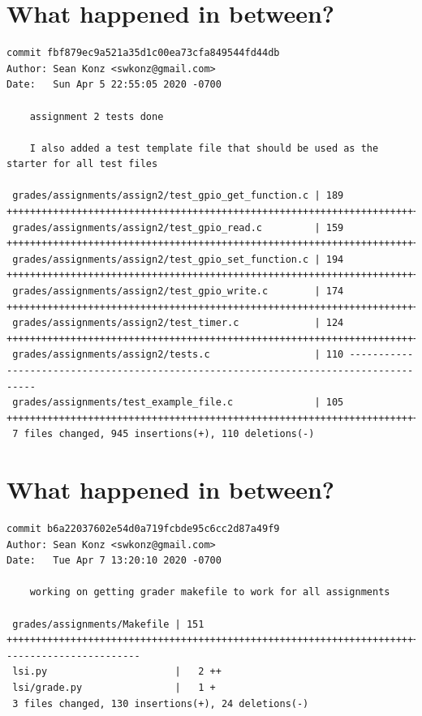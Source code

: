 \documentclass{article}
\begin{document}
\section*{What happened in between?}
\vspace{2ex}
\begin{verbatim}
commit fbf879ec9a521a35d1c00ea73cfa849544fd44db
Author: Sean Konz <swkonz@gmail.com>
Date:   Sun Apr 5 22:55:05 2020 -0700

    assignment 2 tests done

    I also added a test template file that should be used as the starter for all test files

 grades/assignments/assign2/test_gpio_get_function.c | 189 ++++++++++++++++++++++++++++++++++++++++++++++++++++++++++++++++++++++++++++++++++++++++++++++++++++++++++++++++++++++++++++++++++++++++++++++++++++
 grades/assignments/assign2/test_gpio_read.c         | 159 ++++++++++++++++++++++++++++++++++++++++++++++++++++++++++++++++++++++++++++++++++++++++++++++++++++++++++++++++++++++++++++
 grades/assignments/assign2/test_gpio_set_function.c | 194 ++++++++++++++++++++++++++++++++++++++++++++++++++++++++++++++++++++++++++++++++++++++++++++++++++++++++++++++++++++++++++++++++++++++++++++++++++++++++
 grades/assignments/assign2/test_gpio_write.c        | 174 ++++++++++++++++++++++++++++++++++++++++++++++++++++++++++++++++++++++++++++++++++++++++++++++++++++++++++++++++++++++++++++++++++++++++
 grades/assignments/assign2/test_timer.c             | 124 +++++++++++++++++++++++++++++++++++++++++++++++++++++++++++++++++++++++++++++++++++++++++++++++++
 grades/assignments/assign2/tests.c                  | 110 --------------------------------------------------------------------------------------
 grades/assignments/test_example_file.c              | 105 ++++++++++++++++++++++++++++++++++++++++++++++++++++++++++++++++++++++++++++++++++
 7 files changed, 945 insertions(+), 110 deletions(-)

\end{verbatim}

\newpage

\section*{What happened in between?}
\vspace{2ex}
\begin{verbatim}
commit b6a22037602e54d0a719fcbde95c6cc2d87a49f9
Author: Sean Konz <swkonz@gmail.com>
Date:   Tue Apr 7 13:20:10 2020 -0700

    working on getting grader makefile to work for all assignments

 grades/assignments/Makefile | 151 +++++++++++++++++++++++++++++++++++++++++++++++++++++++++++++++++++++++++++++++++++++++++++++++++++++++++++++++++++++++++++++++------------------------
 lsi.py                      |   2 ++
 lsi/grade.py                |   1 +
 3 files changed, 130 insertions(+), 24 deletions(-)

\end{verbatim}
\end{document}
